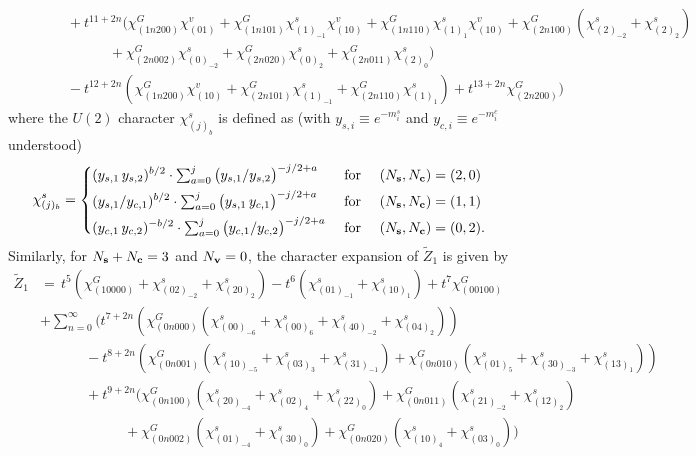 \documentclass[letterpaper, 11pt]{article}
\newcommand{\nn}{\nonumber}
\begin{document}
{\begin{align}
&\qquad\quad+t^{11+2n}(\chi^G_{(1n200)}\chi^v_{(01)}+\chi^G_{(1n101)}\chi^s_{(1)_{-1}}\chi^v_{(10)}+\chi^G_{(1n110)}\chi^s_{(1)_1}\chi^v_{(10)}+\chi^G_{(2n100)}(\chi^s_{(2)_{-2}}+\chi^s_{(2)_2})\nn\\
&\qquad\qquad\qquad+\chi^G_{(2n002)}\chi^s_{(0)_{-2}}+\chi^G_{(2n020)}\chi^s_{(0)_2}+\chi^G_{(2n011)}\chi^s_{(2)_0})\nn\\
&\qquad\quad-t^{12+2n}(\chi^G_{(1n200)}\chi^v_{(10)}+\chi^G_{(2n101)}\chi^s_{(1)_{-1}}+\chi^G_{(2n110)}\chi^s_{(1)_1})+t^{13+2n}\chi^G_{(2n200)}\Big)
\end{align}
where the $U(2)$ character $\chi^s_{(j)_b}$ is defined as (with $y_{s,i} \equiv e^{-m_i^s}$ and $y_{c,i} \equiv e^{-m_i^c}$ understood)
\begin{align}
  \chi^s_{(j)_b} = \begin{dcases}
    (y_{s,1}\,y_{s,2})^{b/2} \cdot \textstyle\sum_{a=0}^{j} \big({y_{s,1}}/{y_{s,2}}\big)^{-j/2+a}& \text{ for } \quad (N_\mathbf{s}, N_\mathbf{c})=(2,0)\\
    (y_{s,1}/y_{c,1})^{b/2} \cdot \textstyle\sum_{a=0}^{j} \big(y_{s,1}\,y_{c,1}\big)^{-j/2+a}& \text{ for } \quad (N_\mathbf{s}, N_\mathbf{c})=(1,1)\\
    (y_{c,1}\,y_{c,2})^{-b/2} \cdot \textstyle\sum_{a=0}^{j} \big(y_{c,1}/y_{c,2}\big)^{-j/2+a}& \text{ for } \quad (N_\mathbf{s}, N_\mathbf{c})=(0,2).
  \end{dcases}
\end{align}
Similarly, for $N_{\bf s} + N_{\bf c} = 3$ and $N_{\bf v} = 0$, the character expansion of $\tilde{Z}_1$ is given by 
\begin{align}
  \label{eq:so10-s3}
\tilde{Z}_1&=\,t^5(\chi^G_{(10000)}+\chi^s_{(02)_{-2}}+\chi^s_{(20)_2})-t^6
(\chi^s_{(01)_{-1}}+\chi^s_{(10)_1})+t^7\chi^G_{(00100)}\nn\\
&+\textstyle\sum_{n=0}^{\infty}\Big(t^{7+2n}(\chi^G_{(0n000)}(\chi^s_{(00)_{-6}}+\chi^s_{(00)_6}+\chi^s_{(40)_{-2}}+\chi^s_{(04)_2}))\nn\\
&\qquad \quad \ -t^{8+2n}(\chi^G_{(0n001)}(\chi^s_{(10)_{-5}}+\chi^s_{(03)_3}+\chi^s_{(31)_{-1}})+\chi^G_{(0n010)}(\chi^s_{(01)_5}+\chi^s_{(30)_{-3}}+\chi^s_{(13)_1}))\nn\\
&\qquad \quad \ +t^{9+2n}(\chi^G_{(0n100)}(\chi^s_{(20)_{-4}}+\chi^s_{(02)_4}+\chi^s_{(22)_0})+\chi^G_{(0n011)}(\chi^s_{(21)_{-2}}+\chi^s_{(12)_2})\nn\\
& \qquad \qquad\qquad+\chi^G_{(0n002)}(\chi^s_{(01)_{-4}}+\chi^s_{(30)_0})+\chi^G_{(0n020)}(\chi^s_{(10)_4}+\chi^s_{(03)_0}))\\

\end{align}}
\end{document}
